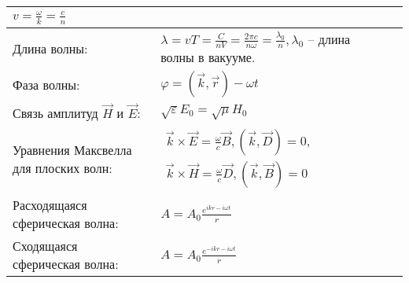 \documentclass{article}
\begin{document}
\begin{tabular}{ |p{4.1cm}|p{5.4cm}|p{4.1cm}|p{4.4cm}|  }
$v = \frac{\omega}{k} = \frac{c}{n}$                                         &  %
                                                                             &  %
                                                                             \\ %
\hline
Длина волны:                                                                 &  %
$\lambda = vT = \frac{C}{nV} = \frac{2 \pi c}{n \omega} =
 \frac{\lambda_0}{n}, \lambda_0$ -- длина волны в вакууме.                   &  %
                                                                             &  %
                                                                             \\ %
\hline
Фаза волны:                                                                  &  %
$\varphi = (\vec{k}, \vec{r}) - \omega t$                                    &  %
                                                                             &  %
                                                                             \\ %
\hline
Связь амплитуд $\vec{H}$ и $\vec{E}$:                                        &  %
$\sqrt{\varepsilon} E_0 = \sqrt{\mu} H_0$                                    &  %
                                                                             &  %
                                                                             \\ %
\hline
Уравнения Максвелла для плоских волн:                                        &  %
$\begin{aligned}
\vec{k} \times \vec{E} = \frac{\omega}{c} \vec{B}, (\vec{k}, \vec{D}) = 0, \\
\vec{k} \times \vec{H} = \frac{\omega}{c} \vec{D}, (\vec{k}, \vec{B}) = 0
\end{aligned}$                                                               &  %
                                                                             &  %
                                                                             \\ %
\hline
Расходящаяся сферическая волна:                                              &  %
$A = A_0 \frac{e^{i k r-i \omega t}}{r}$                                     &  %
                                                                             &  %
                                                                             \\ %
\hline
Сходящаяся сферическая волна:                                                &  %
$A = A_0 \frac{e^{-i k r-i \omega t}}{r}$                                    &  %
                                                                             &  %
                                                                             \\ %
\hline
\end{tabular}

\newpage
\end{document}
